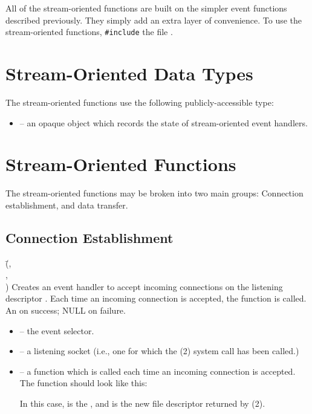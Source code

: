 \documentclass{article}
\newcommand{\Es}{\type{EventSelector}}
\newcommand{\Eh}{\type{EventHandler}}
\begin{document}
All of the stream-oriented functions are built on the simpler event
functions described previously.  They simply add an extra layer of
convenience.  To use the stream-oriented functions,
\texttt{\#include} the file .

\section{Stream-Oriented Data Types}

The stream-oriented functions use the following publicly-accessible type:
\begin{itemize}
\item {} -- an opaque object which records the state
  of stream-oriented event handlers.
\end{itemize}

\section{Stream-Oriented Functions}
\label{sec:basic-stream-oriented-functions}

The stream-oriented functions may be broken into two main groups:
Connection establishment, and data transfer.

\subsection{Connection Establishment}

{(\=,\\
  \> ,\\
  \> )}
{Creates an event handler to accept incoming connections on the listening
  descriptor .  Each time an incoming connection is accepted,
  the function  is called.}
{An \Eh{} on success; NULL on failure.}
\begin{itemize}
\item {} -- the event selector.
\item {} -- a listening socket (i.e., one for which the
  (2) system call has been called.)
\item {} -- a function which is called each time an incoming
  connection is accepted.  The function  should look like this:

   

  In this case,  is the \Es{}, and  is the new file
  descriptor returned by (2).
\end{itemize}
\end{document}
